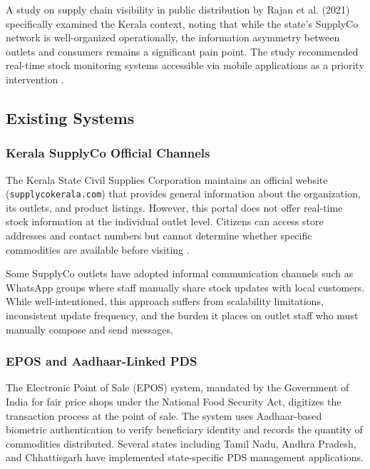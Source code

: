 A study on supply chain visibility in public distribution by Rajan et al. (2021) specifically examined the Kerala context, noting that while the state's SupplyCo network is well-organized operationally, the information asymmetry between outlets and consumers remains a significant pain point. The study recommended real-time stock monitoring systems accessible via mobile applications as a priority intervention \cite{rajan_supply_chain}.

\subsection{Existing Systems}

\subsubsection{Kerala SupplyCo Official Channels}

The Kerala State Civil Supplies Corporation maintains an official website \newline (\texttt{supplycokerala.com}) that provides general information about the organization, its outlets, and product listings. However, this portal does not offer real-time stock information at the individual outlet level. Citizens can access store addresses and contact numbers but cannot determine whether specific commodities are available before visiting \cite{supplyco_official}.

Some SupplyCo outlets have adopted informal communication channels such as WhatsApp groups where staff manually share stock updates with local customers. While well-intentioned, this approach suffers from scalability limitations, inconsistent update frequency, and the burden it places on outlet staff who must manually compose and send messages.

\subsubsection{EPOS and Aadhaar-Linked PDS}

The Electronic Point of Sale (EPOS) system, mandated by the Government of India for fair price shops under the National Food Security Act, digitizes the transaction process at the point of sale. The system uses Aadhaar-based biometric authentication to verify beneficiary identity and records the quantity of commodities distributed. Several states including Tamil Nadu, Andhra Pradesh, and Chhattisgarh have implemented state-specific PDS management applications.

